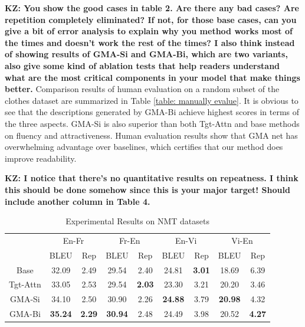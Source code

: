 \documentclass[letterpaper]{article} %
\newcommand{\KZ}[1]{{\bf \color{red} KZ: #1}}
\begin{document}
\KZ{You show the good cases in table 2. Are there any bad cases? Are
repetition completely eliminated? If not, for those base cases, can you
give a bit of error analysis to explain why you method works most of the times
and doesn't work the rest of the times? I also think instead of showing results
of GMA-Si and GMA-Bi, which are two variants, also give some kind of ablation
tests that help readers understand what are the most critical components in
your model that make things better.}
Comparison results of human evaluation on a random subset of the clothes dataset are summarized in Table \ref{table: manually evalue}.
It is obvious to see that the descriptions generated by GMA-Bi achieve highest scores in terms of the three aspects. 
GMA-Si is also superior than both Tgt-Attn and base methods on fluency and attractiveness. 
Human evaluation results show that GMA net has overwhelming advantage over baselines,
which certifies that our method does improve readability.

\KZ{I notice that there's no quantitative results on repeatness. I think this
should be done somehow since this is your major target! Should include another
column in Table 4.}

\begin{table}[h]
\centering
\renewcommand\arraystretch{1.1}
\small
\vspace{1mm}
\begin{tabular}{c|c|c|c|c|c|c|c|c}
\hline
  & \multicolumn{2}{c|}{En-Fr} & \multicolumn{2}{c|}{Fr-En} & \multicolumn{2}{c|}{En-Vi} & \multicolumn{2}{c}{Vi-En} \\ \cline{2-9} 
\multirow{-2}{*}{} & BLEU  & Rep & BLEU  & Rep  & BLEU  & Rep  & BLEU  & Rep  \\ \hline
Base \cite{bahdanau2014neural} & 32.09 & 2.49 & 29.54 & 2.40  & 24.81 & \textbf{3.01 } & 18.69 & 6.39  \\ \hline
Tgt-Attn  & 33.05 & 2.53 & 29.54 &\textbf{ 2.03 } & 23.30 & 3.21  & 20.20 & 3.46  \\ \hline
GMA-Si & 34.10 & 2.50 & 30.90& 2.26&\textbf{24.88}&3.79 & \textbf{20.98} & 4.32  \\ \hline
GMA-Bi  & \textbf{35.24} & \textbf{2.29} &\textbf{30.94} & 2.48 &24.49 &3.98 & 20.52 & \textbf{4.27}\\ \hline
\end{tabular}
\caption{Experimental Results on NMT datasets}
\label{table:NMTexp}
\end{table}
\end{document}
